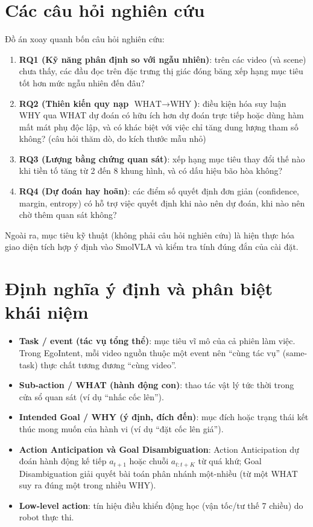 \documentclass[12pt,a4paper]{report}
\begin{document}
\section{Các câu hỏi nghiên cứu}

Đồ án xoay quanh bốn câu hỏi nghiên cứu:
\begin{enumerate}
    \item \textbf{RQ1 (Kỹ năng phân định so với ngẫu nhiên)}: trên các video (và scene) chưa thấy, các đầu đọc trên đặc trưng thị giác đóng băng xếp hạng mục tiêu tốt hơn mức ngẫu nhiên đến đâu?
    \item \textbf{RQ2 (Thiên kiến quy nạp $\text{WHAT}\to\text{WHY}$)}: điều kiện hóa suy luận WHY qua WHAT dự đoán có hữu ích hơn dự đoán trực tiếp hoặc dùng hàm mất mát phụ độc lập, và có khác biệt với việc chỉ tăng dung lượng tham số không? (câu hỏi thăm dò, do kích thước mẫu nhỏ)
    \item \textbf{RQ3 (Lượng bằng chứng quan sát)}: xếp hạng mục tiêu thay đổi thế nào khi tiền tố tăng từ 2 đến 8 khung hình, và có dấu hiệu bão hòa không?
    \item \textbf{RQ4 (Dự đoán hay hoãn)}: các điểm số quyết định đơn giản (confidence, margin, entropy) có hỗ trợ việc quyết định khi nào nên dự đoán, khi nào nên chờ thêm quan sát không?
\end{enumerate}
Ngoài ra, mục tiêu kỹ thuật (không phải câu hỏi nghiên cứu) là hiện thực hóa giao diện tích hợp ý định vào SmolVLA và kiểm tra tính đúng đắn của cài đặt.

\section{Định nghĩa ý định và phân biệt khái niệm}
\label{sec:intention_definition}

\begin{itemize}
    \item \textbf{Task / event (tác vụ tổng thể)}: mục tiêu vĩ mô của cả phiên làm việc. Trong EgoIntent, mỗi video nguồn thuộc một event nên ``cùng tác vụ'' (same-task) thực chất tương đương ``cùng video''.
    \item \textbf{Sub-action / WHAT (hành động con)}: thao tác vật lý tức thời trong cửa sổ quan sát (ví dụ ``nhấc cốc lên'').
    \item \textbf{Intended Goal / WHY (ý định, đích đến)}: mục đích hoặc trạng thái kết thúc mong muốn của hành vi (ví dụ ``đặt cốc lên giá'').
    \item \textbf{Action Anticipation và Goal Disambiguation}: Action Anticipation dự đoán hành động kế tiếp $a_{t+1}$ hoặc chuỗi $a_{t:t+K}$ từ quá khứ; Goal Disambiguation giải quyết bài toán phân nhánh một-nhiều (từ một WHAT suy ra đúng một trong nhiều WHY).
    \item \textbf{Low-level action}: tín hiệu điều khiển động học (vận tốc/tư thế 7 chiều) do robot thực thi.
\end{itemize}
\end{document}
